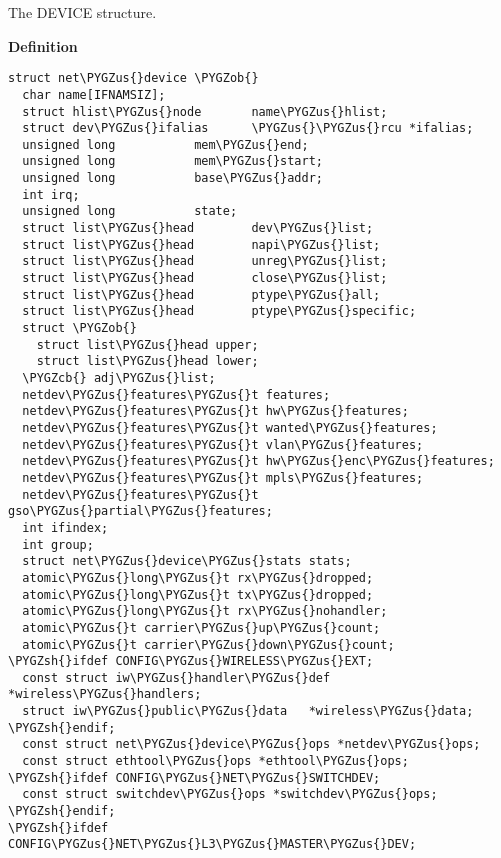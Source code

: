 \documentclass[a4paper,8pt,english]{sphinxmanual}
\def\PYGZus{\char`\_}
\def\PYGZob{\char`\{}
\def\PYGZcb{\char`\}}
\def\PYGZsh{\char`\#}
\begin{document}
\begin{fulllineitems}
\label{networking/kapi:c.net_device}
The DEVICE structure.

\end{fulllineitems}


\textbf{Definition}

\begin{Verbatim}[commandchars=\\\{\}]
struct net\PYGZus{}device \PYGZob{}
  char name[IFNAMSIZ];
  struct hlist\PYGZus{}node       name\PYGZus{}hlist;
  struct dev\PYGZus{}ifalias      \PYGZus{}\PYGZus{}rcu *ifalias;
  unsigned long           mem\PYGZus{}end;
  unsigned long           mem\PYGZus{}start;
  unsigned long           base\PYGZus{}addr;
  int irq;
  unsigned long           state;
  struct list\PYGZus{}head        dev\PYGZus{}list;
  struct list\PYGZus{}head        napi\PYGZus{}list;
  struct list\PYGZus{}head        unreg\PYGZus{}list;
  struct list\PYGZus{}head        close\PYGZus{}list;
  struct list\PYGZus{}head        ptype\PYGZus{}all;
  struct list\PYGZus{}head        ptype\PYGZus{}specific;
  struct \PYGZob{}
    struct list\PYGZus{}head upper;
    struct list\PYGZus{}head lower;
  \PYGZcb{} adj\PYGZus{}list;
  netdev\PYGZus{}features\PYGZus{}t features;
  netdev\PYGZus{}features\PYGZus{}t hw\PYGZus{}features;
  netdev\PYGZus{}features\PYGZus{}t wanted\PYGZus{}features;
  netdev\PYGZus{}features\PYGZus{}t vlan\PYGZus{}features;
  netdev\PYGZus{}features\PYGZus{}t hw\PYGZus{}enc\PYGZus{}features;
  netdev\PYGZus{}features\PYGZus{}t mpls\PYGZus{}features;
  netdev\PYGZus{}features\PYGZus{}t gso\PYGZus{}partial\PYGZus{}features;
  int ifindex;
  int group;
  struct net\PYGZus{}device\PYGZus{}stats stats;
  atomic\PYGZus{}long\PYGZus{}t rx\PYGZus{}dropped;
  atomic\PYGZus{}long\PYGZus{}t tx\PYGZus{}dropped;
  atomic\PYGZus{}long\PYGZus{}t rx\PYGZus{}nohandler;
  atomic\PYGZus{}t carrier\PYGZus{}up\PYGZus{}count;
  atomic\PYGZus{}t carrier\PYGZus{}down\PYGZus{}count;
\PYGZsh{}ifdef CONFIG\PYGZus{}WIRELESS\PYGZus{}EXT;
  const struct iw\PYGZus{}handler\PYGZus{}def *wireless\PYGZus{}handlers;
  struct iw\PYGZus{}public\PYGZus{}data   *wireless\PYGZus{}data;
\PYGZsh{}endif;
  const struct net\PYGZus{}device\PYGZus{}ops *netdev\PYGZus{}ops;
  const struct ethtool\PYGZus{}ops *ethtool\PYGZus{}ops;
\PYGZsh{}ifdef CONFIG\PYGZus{}NET\PYGZus{}SWITCHDEV;
  const struct switchdev\PYGZus{}ops *switchdev\PYGZus{}ops;
\PYGZsh{}endif;
\PYGZsh{}ifdef CONFIG\PYGZus{}NET\PYGZus{}L3\PYGZus{}MASTER\PYGZus{}DEV;

\end{Verbatim}
\end{document}
